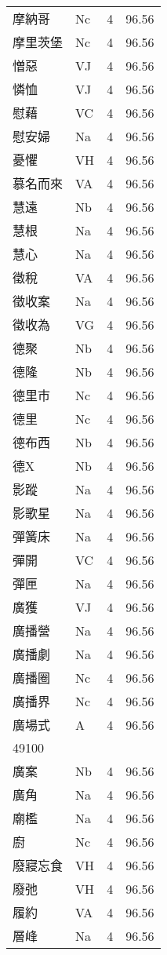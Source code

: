 \documentclass[twocolumn]{book}
\begin{document}
\begin{supertabular}{llrr}
摩納哥 & Nc & 4 &  96.56\\
摩里茨堡 & Nc & 4 &  96.56\\
憎惡 & VJ & 4 &  96.56\\
憐恤 & VJ & 4 &  96.56\\
慰藉 & VC & 4 &  96.56\\
慰安婦 & Na & 4 &  96.56\\
憂懼 & VH & 4 &  96.56\\
慕名而來 & VA & 4 &  96.56\\
慧遠 & Nb & 4 &  96.56\\
慧根 & Na & 4 &  96.56\\
慧心 & Na & 4 &  96.56\\
徵稅 & VA & 4 &  96.56\\
徵收案 & Na & 4 &  96.56\\
徵收為 & VG & 4 &  96.56\\
德聚 & Nb & 4 &  96.56\\
德隆 & Nb & 4 &  96.56\\
德里市 & Nc & 4 &  96.56\\
德里 & Nc & 4 &  96.56\\
德布西 & Nb & 4 &  96.56\\
德X & Nb & 4 &  96.56\\
影蹤 & Na & 4 &  96.56\\
影歌星 & Na & 4 &  96.56\\
彈簧床 & Na & 4 &  96.56\\
彈開 & VC & 4 &  96.56\\
彈匣 & Na & 4 &  96.56\\
廣獲 & VJ & 4 &  96.56\\
廣播營 & Na & 4 &  96.56\\
廣播劇 & Na & 4 &  96.56\\
廣播圈 & Nc & 4 &  96.56\\
廣播界 & Nc & 4 &  96.56\\
廣場式 & A & 4 &  96.56\\
49100\\
廣案 & Nb & 4 &  96.56\\
廣角 & Na & 4 &  96.56\\
廟檻 & Na & 4 &  96.56\\
廚 & Nc & 4 &  96.56\\
廢寢忘食 & VH & 4 &  96.56\\
廢弛 & VH & 4 &  96.56\\
履約 & VA & 4 &  96.56\\
層峰 & Na & 4 &  96.56\\

\end{supertabular}
\end{document}
